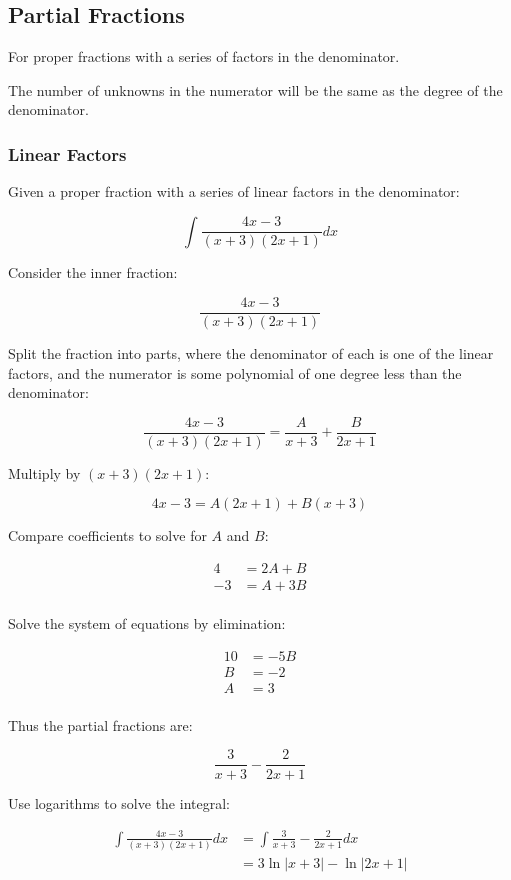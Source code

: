 \documentclass[a4paper,11pt]{report}
\begin{document}
\subsection{Partial Fractions}

For proper fractions with a series of factors in the denominator.

The number of unknowns in the numerator will be the same as the degree of the
denominator.

\subsubsection{Linear Factors}

Given a proper fraction with a series of linear factors in the denominator:

$$
\int \frac{4x - 3}{(x + 3)(2x + 1)} dx
$$

Consider the inner fraction:

$$
\frac{4x - 3}{(x + 3)(2x + 1)}
$$

Split the fraction into parts, where the denominator of each is one of the
linear factors, and the numerator is some polynomial of one degree less than
the denominator:

$$
\frac{4x - 3}{(x + 3)(2x + 1)} = \frac{A}{x + 3} + \frac{B}{2x + 1}
$$

Multiply by $(x + 3)(2x + 1)$:

$$
4x - 3 = A(2x + 1) + B(x + 3)
$$

Compare coefficients to solve for $A$ and $B$:

$$
\begin{aligned}
4 & = 2A + B \\
-3 & = A + 3B \\
\end{aligned}
$$

Solve the system of equations by elimination:

$$
\begin{aligned}
10 & = -5B \\
B & = -2 \\
A & = 3 \\
\end{aligned}
$$

Thus the partial fractions are:

$$
\frac{3}{x + 3} - \frac{2}{2x + 1}
$$

Use logarithms to solve the integral:

$$
\begin{aligned}
\int \frac{4x - 3}{(x + 3)(2x + 1)} dx & = \int \frac{3}{x + 3} - \frac{2}{2x + 1} dx \\
& = 3\ln{|x + 3|} - \ln{|2x + 1|} \\
\end{aligned}
$$
\end{document}
